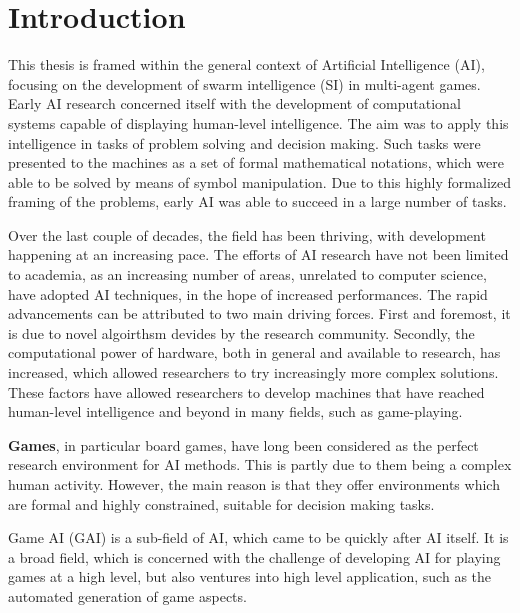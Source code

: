 \section{Introduction} \label{section:introduction}
This thesis is framed within the general context of Artificial Intelligence (AI), 
focusing on the development of swarm intelligence (SI) in multi-agent games.
Early AI research concerned itself with the development of computational systems capable of displaying human-level intelligence.
The aim was to apply this intelligence in tasks of problem solving and decision making.
Such tasks were presented to the machines as a set of formal mathematical notations, 
which were able to be solved by means of symbol manipulation.
Due to this highly formalized framing of the problems, 
early AI was able to succeed in a large number of tasks.

Over the last couple of decades, the field has been thriving, 
with development happening at an increasing pace.
The efforts of AI research have not been limited to academia, 
as an increasing number of areas, unrelated to computer science, have adopted AI techniques, 
in the hope of increased performances.
The rapid advancements can be attributed to two main driving forces.
First and foremost, it is due to novel algoirthsm devides by the research community.
Secondly, the computational power of hardware, both in general and available to research, has increased, 
which allowed researchers to try increasingly more complex solutions.
These factors have allowed researchers to develop machines that have reached human-level intelligence and beyond in many fields, 
such as game-playing.

\textbf{Games}, in particular board games, have long been considered as the perfect research environment for AI methods.
This is partly due to them being a complex human activity.
However, the main reason is that they offer environments which are formal and highly constrained, 
suitable for decision making tasks. 

Game AI (GAI) is a sub-field of AI, which came to be quickly after AI itself.
It is a broad field, which is concerned with the challenge of developing AI for playing games at a high level, 
but also ventures into high level application, such as the automated generation of game aspects.


